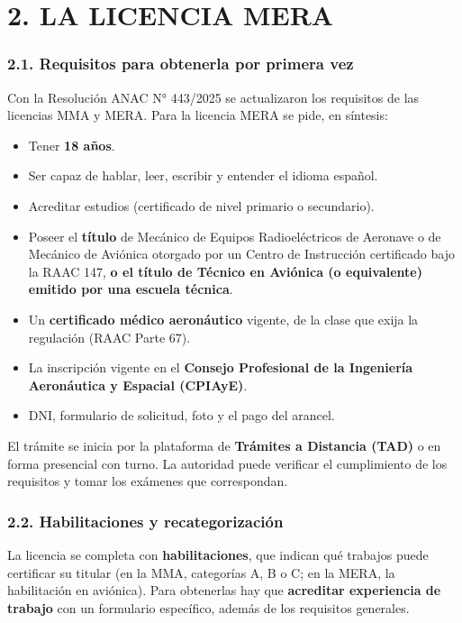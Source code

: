 \section*{2. LA LICENCIA MERA}

\subsubsection*{2.1. Requisitos para obtenerla por primera vez}
Con la Resolución ANAC N° 443/2025 se actualizaron los requisitos de las licencias MMA y MERA.
Para la licencia MERA se pide, en síntesis:
\begin{itemize}
  \item Tener \textbf{18 años}.
  \item Ser capaz de hablar, leer, escribir y entender el idioma español.
  \item Acreditar estudios (certificado de nivel primario o secundario).
  \item Poseer el \textbf{título} de Mecánico de Equipos Radioeléctricos de Aeronave o de
        Mecánico de Aviónica otorgado por un Centro de Instrucción certificado bajo la RAAC 147,
        \textbf{o el título de Técnico en Aviónica (o equivalente) emitido por una escuela
        técnica}.
  \item Un \textbf{certificado médico aeronáutico} vigente, de la clase que exija la regulación
        (RAAC Parte 67).
  \item La inscripción vigente en el \textbf{Consejo Profesional de la Ingeniería Aeronáutica y
        Espacial (CPIAyE)}.
  \item DNI, formulario de solicitud, foto y el pago del arancel.
\end{itemize}
El trámite se inicia por la plataforma de \textbf{Trámites a Distancia (TAD)} o en forma
presencial con turno. La autoridad puede verificar el cumplimiento de los requisitos y tomar los
exámenes que correspondan.

\subsubsection*{2.2. Habilitaciones y recategorización}
La licencia se completa con \textbf{habilitaciones}, que indican qué trabajos puede certificar su
titular (en la MMA, categorías A, B o C; en la MERA, la habilitación en aviónica). Para obtenerlas
hay que \textbf{acreditar experiencia de trabajo} con un formulario específico, además de los
requisitos generales.

